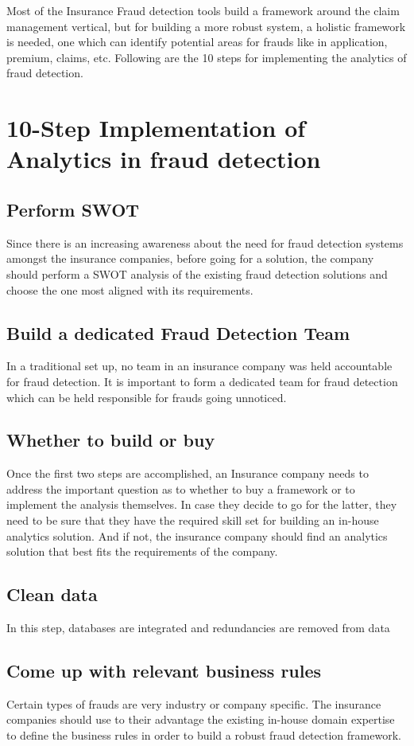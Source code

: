 \documentclass[sigconf]{acmart}
\begin{document}
Most of the Insurance Fraud detection tools build a framework around the claim management vertical, but for building a more robust system, a holistic framework is needed, one which can identify potential areas for frauds like in application, premium, claims, etc. Following are the 10 steps for implementing the analytics of fraud detection.

\section{10-Step Implementation of Analytics in fraud detection}
\subsection{Perform SWOT}
Since there is an increasing awareness about the need for fraud detection systems amongst the insurance companies, before going for a solution, the company should perform a SWOT analysis of the existing fraud detection solutions and choose the one most aligned with its requirements.
\subsection{Build a dedicated Fraud Detection Team}
In a traditional set up, no team in an insurance company was held accountable for fraud detection. It is important to form a dedicated team for fraud detection which can be held responsible for frauds going unnoticed.
\subsection{Whether to build or buy	}
Once the first two steps are accomplished, an Insurance company needs to address the important question as to whether to buy a framework or to implement the analysis themselves. In case they decide to go for the latter, they need to be sure that they have the required skill set for building an in-house analytics solution. And if not, the insurance company should find an analytics solution that best fits the requirements of the company. 
\subsection{Clean data}
In this step, databases are integrated and redundancies are removed from data 
\subsection{Come up with relevant business rules}
Certain types of frauds are very industry or company specific. The insurance companies should use to their advantage the existing in-house domain expertise to define the business rules in order to build a robust fraud detection framework.
\end{document}
